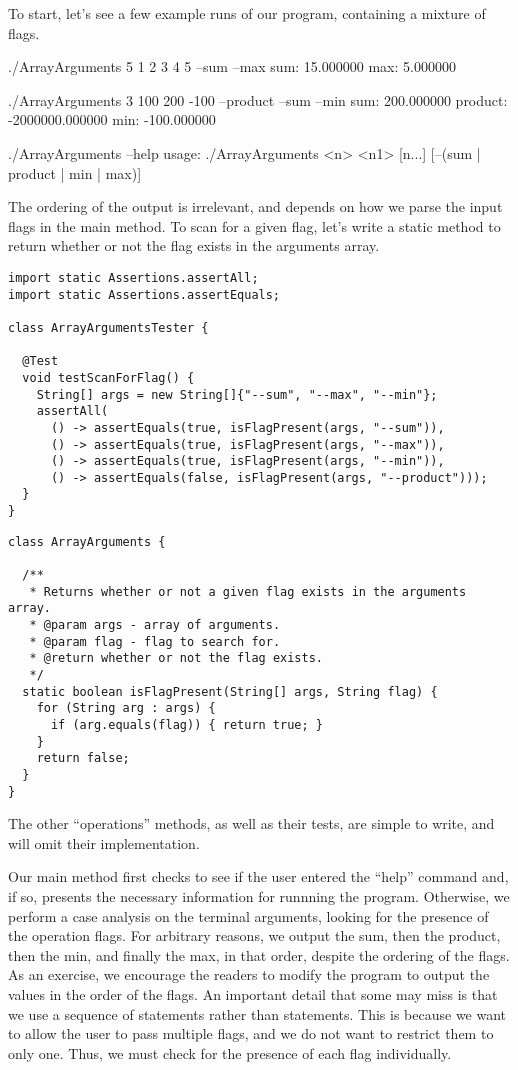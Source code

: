 To start, let's see a few example runs of our program, containing a mixture of flags.

\begin{verbnobox}[\small]
./ArrayArguments 5 1 2 3 4 5 --sum --max
sum: 15.000000
max: 5.000000

./ArrayArguments 3 100 200 -100 --product --sum --min
sum: 200.000000
product: -2000000.000000
min: -100.000000

./ArrayArguments --help
usage: ./ArrayArguments <n> <n1> [n...] [--(sum | product | min | max)]
\end{verbnobox}

The ordering of the output is irrelevant, and depends on how we parse the input flags in the main method. To scan for a given flag, let's write a static method to return whether or not the flag exists in the arguments array.

\begin{lstlisting}[language=MyJava]
import static Assertions.assertAll;
import static Assertions.assertEquals;

class ArrayArgumentsTester {

  @Test
  void testScanForFlag() {
    String[] args = new String[]{"--sum", "--max", "--min"};
    assertAll(
      () -> assertEquals(true, isFlagPresent(args, "--sum")),
      () -> assertEquals(true, isFlagPresent(args, "--max")),
      () -> assertEquals(true, isFlagPresent(args, "--min")),
      () -> assertEquals(false, isFlagPresent(args, "--product")));
  }
}
\end{lstlisting}

\begin{lstlisting}[language=MyJava]
class ArrayArguments {

  /**
   * Returns whether or not a given flag exists in the arguments array.
   * @param args - array of arguments.
   * @param flag - flag to search for.
   * @return whether or not the flag exists.
   */
  static boolean isFlagPresent(String[] args, String flag) {
    for (String arg : args) {
      if (arg.equals(flag)) { return true; }
    }
    return false;
  }
}
\end{lstlisting}

The other ``operations'' methods, as well as their tests, are simple to write, and will omit their implementation. 

Our main method first checks to see if the user entered the ``help'' command and, if so, presents the necessary information for runnning the program. Otherwise, we perform a case analysis on the terminal arguments, looking for the presence of the operation flags. For arbitrary reasons, we output the sum, then the product, then the min, and finally the max, in that order, despite the ordering of the flags. As an exercise, we encourage the readers to modify the program to output the values in the order of the flags. An important detail that some may miss is that we use a sequence of  statements rather than  statements. This is because we want to allow the user to pass multiple flags, and we do not want to restrict them to only one. Thus, we must check for the presence of each flag individually.

